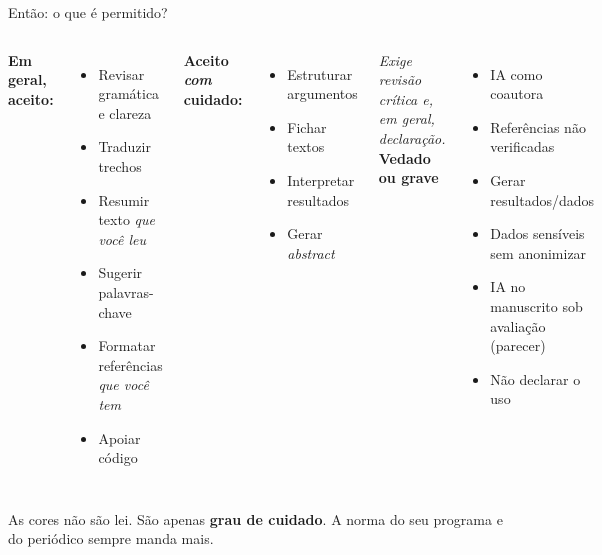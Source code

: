 \documentclass[11pt,aspectratio=169,t]{beamer}
\begin{document}
\begin{frame}{Então: o que é permitido?}
  \footnotesize
  \begin{columns}[t]
    \textbf{\color{verdeCodigo}Em geral, aceito:}
    \begin{itemize}
      \item Revisar gramática e clareza
      \item Traduzir trechos
      \item Resumir texto \textit{que você leu}
      \item Sugerir palavras-chave
      \item Formatar referências \textit{que você tem}
      \item Apoiar código
    \end{itemize}
    \textbf{\color{laranjaDestaque}Aceito \textit{com} cuidado:}
    \begin{itemize}
      \item Estruturar argumentos
      \item Fichar textos
      \item Interpretar resultados
      \item Gerar \textit{abstract}
    \end{itemize}
    \vspace{0.1cm}
    \scriptsize\textit{Exige revisão crítica e, em geral, declaração.}
    \textbf{\color{laranjaDestaque}Vedado ou grave}
    \begin{itemize}
      \item IA como coautora
      \item Referências não verificadas
      \item Gerar resultados/dados
      \item Dados sensíveis sem anonimizar
      \item IA no manuscrito sob avaliação (parecer)
      \item Não declarar o uso
    \end{itemize}
  \end{columns}
  \pause
  \vspace{0.05cm}
  \begin{alertblock}{}
    \centering As cores não são lei. São apenas \textbf{grau de cuidado}. A norma do seu programa e do periódico sempre manda mais.
  \end{alertblock}
\end{frame}
\end{document}

